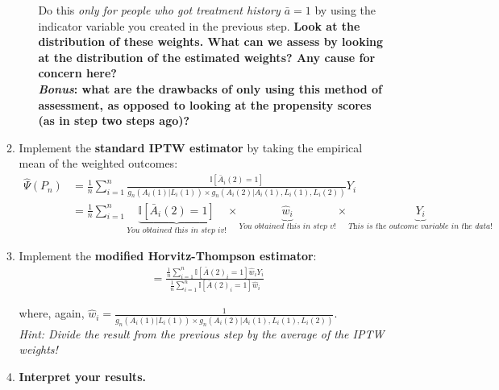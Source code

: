 \documentclass{exam}
\begin{document}
\begin{enumerate}
\begin{enumerate}
\begin{enumerate}
Do this \textit{only for people who got treatment history $\bar{a} = 1$} by using the indicator variable you created in the previous step. \textbf{Look at the distribution of these weights. What can we assess by looking at the distribution of the estimated weights? Any cause for concern here?\\
\textit{Bonus}: what are the drawbacks of only using this method of assessment, as opposed to looking at the propensity scores (as in step two steps ago)?}
\end{enumerate}
\item Implement the \textbf{standard IPTW estimator} by taking the empirical mean of the weighted outcomes:
\begin{align*}
\hat{\Psi}(P_n) & =\frac{1}{n}\sum_{i=1}^n\frac{\mathbb{I}[\bar{A}_i(2)=1]}{g_n(A_i(1)|L_i(1))\times g_n(A_i(2)|A_i(1), L_i(1), L_i(2))}Y_i \\
& =\frac{1}{n}\sum_{i=1}^n\underbrace{\mathbb{I}[\bar{A}_i(2)=1]}_{\textit{You obtained this in step iv!}} \times \underbrace{\hat{w}_i}_{\textit{You obtained this in step v!}} \times \underbrace{Y_i}_{\textit{This is the outcome variable in the data!}}
\end{align*}
\item Implement the \textbf{modified Horvitz-Thompson estimator}:
\begin{align*}
& = \frac{\frac{1}{n}\sum_{i=1}^n\mathbb{I}[\bar{A}(2)_i=1]\hat{w}_iY_i}{\frac{1}{n}\sum_{i=1}^n\mathbb{I}[\bar{A}(2)_i=1]\hat{w}_i}
\end{align*}

where, again, $\hat{w}_i = \frac{1}{g_n(A_i(1)|L_i(1))\times g_n(A_i(2)|A_i(1), L_i(1), L_i(2))}$. \\
\textit{Hint: Divide the result from the previous step by the average of the IPTW weights!}
\item \textbf{Interpret your results.}
\end{enumerate}

\begin{solution}



\end{solution}
\end{enumerate}
\end{document}

